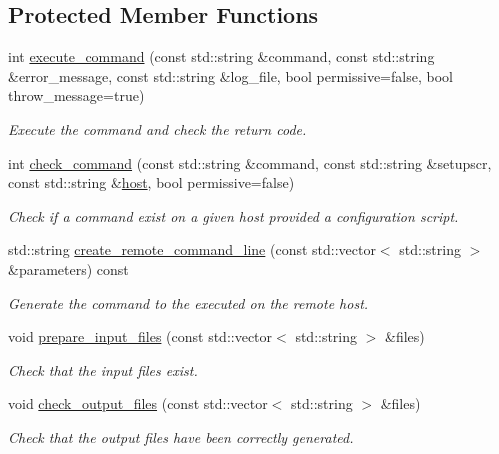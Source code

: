 \subsection*{Protected Member Functions}
\begin{DoxyCompactItemize}
\item 
int \hyperlink{classToolManager_aa19f7107e57fbb649f0418bc074c0736}{execute\+\_\+command} (const std\+::string \&command, const std\+::string \&error\+\_\+message, const std\+::string \&log\+\_\+file, bool permissive=false, bool throw\+\_\+message=true)
\begin{DoxyCompactList}\small\item\em Execute the command and check the return code. \end{DoxyCompactList}\item 
int \hyperlink{classToolManager_a0301402158ba7ebe5a5f81b04809b761}{check\+\_\+command} (const std\+::string \&command, const std\+::string \&setupscr, const std\+::string \&\hyperlink{classToolManager_a08d743e6d2aa5bfe5917130574d06a87}{host}, bool permissive=false)
\begin{DoxyCompactList}\small\item\em Check if a command exist on a given host provided a configuration script. \end{DoxyCompactList}\item 
std\+::string \hyperlink{classToolManager_aaa21b7a46e2bc7c2d0842107224f54b4}{create\+\_\+remote\+\_\+command\+\_\+line} (const std\+::vector$<$ std\+::string $>$ \&parameters) const
\begin{DoxyCompactList}\small\item\em Generate the command to the executed on the remote host. \end{DoxyCompactList}\item 
void \hyperlink{classToolManager_ac300930662a619e8d71346241f766d5a}{prepare\+\_\+input\+\_\+files} (const std\+::vector$<$ std\+::string $>$ \&files)
\begin{DoxyCompactList}\small\item\em Check that the input files exist. \end{DoxyCompactList}\item 
void \hyperlink{classToolManager_ae3000ed97885017b442bc46241053510}{check\+\_\+output\+\_\+files} (const std\+::vector$<$ std\+::string $>$ \&files)
\begin{DoxyCompactList}\small\item\em Check that the output files have been correctly generated. \end{DoxyCompactList}\item 

\end{DoxyCompactItemize}
